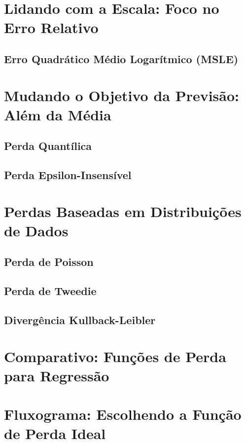 \section{Lidando com a Escala: Foco no Erro Relativo}

\subsection{Erro Quadrático Médio Logarítmico (MSLE)}

\section{Mudando o Objetivo da Previsão: Além da Média}

\subsection{Perda Quantílica}

\subsection{Perda Epsilon-Insensível}

\section{Perdas Baseadas em Distribuições de Dados}

\subsection{Perda de Poisson}

\subsection{Perda de Tweedie}

\subsection{Divergência Kullback-Leibler}

\section{Comparativo: Funções de Perda para Regressão}

\section{Fluxograma: Escolhendo a Função de Perda Ideal}